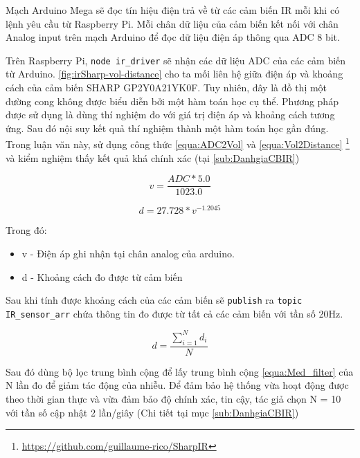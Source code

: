 Mạch Arduino Mega sẽ đọc tín hiệu điện trả về từ các cảm biến IR mỗi khi có lệnh yêu cầu từ Raspberry Pi. Mỗi chân dữ liệu của cảm biến kết nối với chân Analog input trên mạch Arduino để đọc dữ liệu điện áp thông qua ADC 8 bit.

Trên Raspberry Pi, {\tt node ir\_driver} sẽ nhận các dữ liệu ADC của các cảm biến từ Arduino. \figurename{ \ref{fig:irSharp-vol-distance}} cho ta mối liên hệ giữa điện áp và khoảng cách của cảm biến SHARP GP2Y0A21YK0F. Tuy nhiên, đây là đồ thị một đường cong không được biểu diễn bởi một hàm toán học cụ thể. Phương pháp được sử dụng là dùng thí nghiệm đo với giá trị điện áp và khoảng cách tương ứng. Sau đó nội suy kết quả thí nghiệm thành một hàm toán học gần đúng. Trong luận văn này, sử dụng công thức \ref{equa:ADC2Vol} và \ref{equa:Vol2Distance} \footnote{\url{https://github.com/guillaume-rico/SharpIR}} và kiểm nghiệm thấy kết quả khá chính xác (tại \ref{sub:DanhgiaCBIR})

\begin{equation}
    v = \frac{ADC * 5.0}{1023.0}
    \label{equa:ADC2Vol}
\end{equation}

\begin{equation}
    d = 27.728 * {v}^{-1.2045}
    \label{equa:Vol2Distance}
\end{equation}

Trong đó:
\begin{itemize}
    \item v - Điện áp ghi nhận tại chân analog của arduino.
    \item d - Khoảng cách đo được từ cảm biến
\end{itemize}

Sau khi tính được khoảng cách của các cảm biến sẽ {\tt publish} ra {\tt topic IR\_sensor\_arr} chứa thông tin đo được từ tất cả các cảm biến với tần số 20Hz.

\begin{equation}
    d = \frac{\sum_{i=1}^{N} d_i}{N}
    \label{equa:Med_filter}
\end{equation}

Sau đó dùng bộ lọc trung bình cộng để lấy trung bình cộng \ref{equa:Med_filter} của N lần đo để giảm tác động của nhiễu. Để đảm bảo hệ thống vừa hoạt động được theo thời gian thực và vừa đảm bảo độ chính xác, tin cậy, tác giả chọn N = 10 với tần số cập nhật 2 lần/giây (Chi tiết tại mục \ref{sub:DanhgiaCBIR})

